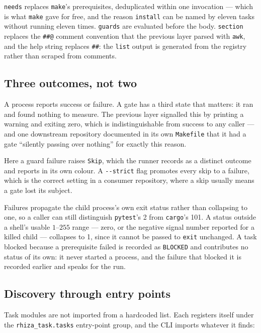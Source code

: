 \documentclass[11pt,a4paper]{article}
\begin{document}
\texttt{needs} replaces \texttt{make}'s prerequisites, deduplicated within one invocation
--- which is what \texttt{make} gave for free, and the reason \texttt{install} can be named
by eleven tasks without running eleven times. \texttt{guards} are evaluated before the
body. \texttt{section} replaces the \texttt{\#\#@} comment convention that the previous
layer parsed with \texttt{awk}, and the help string replaces \texttt{\#\#}: the
\texttt{list} output is generated from the registry rather than scraped from comments.

\subsection{Three outcomes, not two}

A process reports success or failure. A gate has a third state that matters: it ran and
found nothing to measure. The previous layer signalled this by printing a warning and
exiting zero, which is indistinguishable from success to any caller --- and one downstream
repository documented in its own \texttt{Makefile} that it had a gate ``silently passing
over nothing'' for exactly this reason.

Here a guard failure raises \texttt{Skip}, which the runner records as a distinct outcome
and reports in its own colour. A \texttt{-{}-strict} flag promotes every skip to a failure,
which is the correct setting in a consumer repository, where a skip usually means a gate
lost its subject.

Failures propagate the child process's own exit status rather than collapsing to one, so a
caller can still distinguish \texttt{pytest}'s 2 from \texttt{cargo}'s 101. A status outside
a shell's usable $1$--$255$ range --- zero, or the negative signal number reported for a
killed child --- collapses to 1, since it cannot be passed to \texttt{exit} unchanged. A
task blocked because a prerequisite failed is recorded as \texttt{BLOCKED} and contributes
no status of its own: it never started a process, and the failure that blocked it is
recorded earlier and speaks for the run.

\subsection{Discovery through entry points}

Task modules are not imported from a hardcoded list. Each registers itself under the
\texttt{rhiza\_task.tasks} entry-point group, and the CLI imports whatever it finds:
\end{document}
